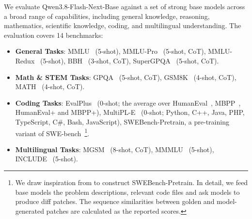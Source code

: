 \label{sec:pt_eval}
We evaluate Qwen3.8-Flash-Next-Base against a set of strong base models across a broad range of capabilities, including general knowledge, reasoning, mathematics, scientific knowledge, coding, and multilingual understanding. The evaluation covers 14 benchmarks:

%
\begin{itemize}

\item \textbf{General Tasks}: MMLU~\citep{mmlu} (5-shot), MMLU-Pro~\citep{wang2024mmlu} (5-shot, CoT), MMLU-Redux~\citep{mmluredux} (5-shot), BBH~\citep{suzgun2022bbh} (3-shot, CoT), SuperGPQA~\citep{supergpqa} (5-shot, CoT).

\item \textbf{Math \& STEM Tasks}: GPQA~\citep{reinhardt2023gpqa} (5-shot, CoT), GSM8K~\citep{cobbe2021training} (4-shot, CoT), MATH~\citep{hendrycks2021measuring} (4-shot, CoT).

\item \textbf{Coding Tasks}: EvalPlus~\citep{evalplus} (0-shot; the average over HumanEval~\citep{humaneval}, MBPP~\citep{austin2021mbpp}, HumanEval+ and MBPP+), MultiPL-E~\citep{cassano2023multipl} (0-shot; Python, C++, Java, PHP, TypeScript, C\#, Bash, JavaScript), SWEBench-Pretrain, a pre-training variant of SWE-bench~\citep{swebench}\footnote{We draw inspiration from \citet{xia2024agentless} to construct SWEBench-Pretrain. In detail, we feed base models the problem descriptions, relevant code files and ask models to produce diff patches. The sequence similarities between golden and model-generated patches are calculated as the reported scores.}.

\item \textbf{Multilingual Tasks}: MGSM~\citep{shi2022language} (8-shot, CoT), MMMLU~\citep{openai2024mmmlu} (5-shot), INCLUDE~\citep{include} (5-shot).

\end{itemize}


